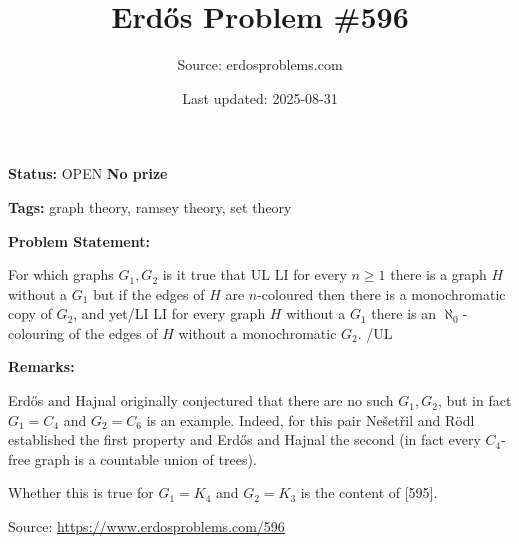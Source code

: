 \documentclass{article}
\title{Erd\H{o}s Problem \#596}
\date{Last updated: 2025-08-31}
\author{Source: erdosproblems.com}
\begin{document}
\maketitle

\noindent\textbf{Status:} OPEN \quad \textbf{No prize}

\noindent\textbf{Tags:} graph theory, ramsey theory, set theory

\medskip
\noindent\textbf{Problem Statement:}

For which graphs $G_1,G_2$ is it true that
{UL}
{LI} for every $n\geq 1$ there is a graph $H$ without a $G_1$ but if the edges of $H$ are $n$-coloured then there is a monochromatic copy of $G_2$, and yet{/LI}
{LI} for every graph $H$ without a $G_1$ there is an $\aleph_0$-colouring of the edges of $H$ without a monochromatic $G_2$.
{/UL}

\bigskip
\noindent\textbf{Remarks:}

Erd\H{o}s and Hajnal originally conjectured that there are no such $G_1,G_2$, but in fact $G_1=C_4$ and $G_2=C_6$ is an example. Indeed, for this pair Ne\v{s}et\v{r}il and R\"{o}dl established the first property and Erd\H{o}s and Hajnal the second (in fact every $C_4$-free graph is a countable union of trees). 

Whether this is true for $G_1=K_4$ and $G_2=K_3$ is the content of [595].

\bigskip
\noindent\small{Source: \url{https://www.erdosproblems.com/596}}
\end{document}
